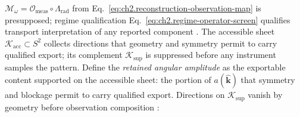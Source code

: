 \(\mathcal{M}_\omega=\mathcal{O}_{\mathrm{meas}}\circ\Lambda_{\mathrm{rad}}\) from
Eq.~\eqref{eq:ch2.reconstruction-observation-map} is presupposed; regime qualification
Eq.~\eqref{eq:ch2.regime-operator-screen} qualifies transport interpretation of any reported
component \cite{harrington2001}.
The accessible sheet \(\mathcal{K}_{\mathrm{acc}}\subset S^{2}\) collects directions that
geometry and symmetry permit to carry qualified export; its complement
\(\mathcal{K}_{\mathrm{sup}}\) is suppressed before any instrument samples the pattern.
Define the \emph{retained angular amplitude} as the exportable content supported on the
accessible sheet: the portion of $a(\widehat{\mathbf{k}})$ that symmetry and blockage permit
to carry qualified export. Directions on $\mathcal{K}_{\mathrm{sup}}$ vanish by geometry before
observation composition \cite{stratton1941}:

